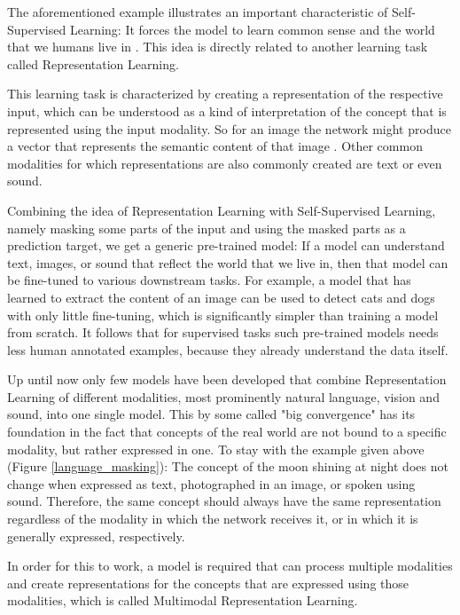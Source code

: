 The aforementioned example illustrates an important characteristic of Self-Supervised Learning:
It forces the model to learn common sense and the world that we humans live in \cite{lecun}.
This idea is directly related to another learning task called Representation Learning.

This learning task is characterized by creating a representation of the respective input,
which can be understood as a kind of interpretation of the concept that is represented using 
the input modality. So for an image the network might produce a vector that represents the semantic 
content of that image \cite{wu}\cite{he}\cite{chen}. Other common modalities for which representations
are also commonly created are text or even sound.

Combining the idea of Representation Learning with Self-Supervised Learning, namely masking
some parts of the input and using the masked parts as a prediction target, we get 
a generic pre-trained model: If a model can understand text, images, or sound that reflect 
the world that we live in, then that model can be fine-tuned to various downstream tasks.
For example, a model that has learned to extract the content of an image can be used
to detect cats and dogs with only little fine-tuning, which is significantly simpler than
training a model from scratch.
It follows that for supervised tasks such pre-trained models needs less human annotated examples, 
because they already understand the data itself.

Up until now only few models have been developed that combine Representation Learning
of different modalities, most prominently natural language, vision and sound, into one single model.
This by some called "big convergence" \cite{wang} has its foundation in the fact
that concepts of the real world are not bound to a specific modality, but rather
expressed in one.
To stay with the example given above (Figure \ref{language_masking}): The concept of the moon shining 
at night does not change when expressed as text, photographed in an image, or spoken using sound.
Therefore, the same concept should always have the same representation regardless of the modality
in which the network receives it, or in which it is generally expressed, respectively.

In order for this to work, a model is required that can process multiple modalities and create
representations for the concepts that are expressed using those modalities, which is called Multimodal
Representation Learning.

